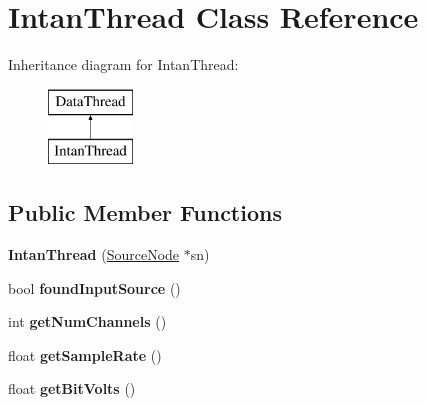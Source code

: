 \hypertarget{classIntanThread}{\section{Intan\-Thread Class Reference}
\label{classIntanThread}
}
Inheritance diagram for Intan\-Thread\-:\begin{figure}[H]
\begin{center}
\leavevmode
\includegraphics[height=2.000000cm]{classIntanThread}
\end{center}
\end{figure}
\subsection*{Public Member Functions}
\begin{DoxyCompactItemize}
\item 
\hypertarget{classIntanThread_ab42cbde857103d37c88bbf3d7df247eb}{{\bfseries Intan\-Thread} (\hyperlink{classSourceNode}{Source\-Node} $\ast$sn)}\label{classIntanThread_ab42cbde857103d37c88bbf3d7df247eb}

\item 
\hypertarget{classIntanThread_acd7222cc5aa5495fc9b99ccc89b57fc2}{bool {\bfseries found\-Input\-Source} ()}\label{classIntanThread_acd7222cc5aa5495fc9b99ccc89b57fc2}

\item 
\hypertarget{classIntanThread_a8b5d9057c93ce0e476e994274cdd35fc}{int {\bfseries get\-Num\-Channels} ()}\label{classIntanThread_a8b5d9057c93ce0e476e994274cdd35fc}

\item 
\hypertarget{classIntanThread_af75991b755889843df9e30e259fe7465}{float {\bfseries get\-Sample\-Rate} ()}\label{classIntanThread_af75991b755889843df9e30e259fe7465}

\item 
\hypertarget{classIntanThread_ad2020007cf90134f414a6c0413e63127}{float {\bfseries get\-Bit\-Volts} ()}\label{classIntanThread_ad2020007cf90134f414a6c0413e63127}

\end{DoxyCompactItemize}
